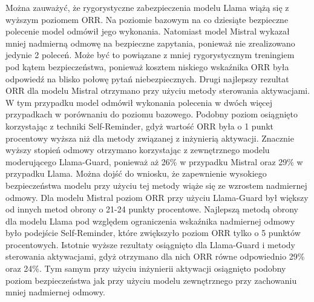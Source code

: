 Można zauważyć, że rygorystyczne zabezpieczenia modelu Llama wiążą się z wyższym poziomem \gls{ORR}. Na poziomie bazowym na co dziesiąte bezpieczne polecenie model odmówił jego wykonania. Natomiast model Mistral wykazał mniej nadmierną odmowę na bezpieczne zapytania, ponieważ nie zrealizowano jedynie 2 poleceń. Może być to powiązane z mniej rygorystycznym treningiem pod kątem bezpieczeństwa, ponieważ kosztem niskiego wskaźnika \gls{ORR} była odpowiedź na blisko połowę pytań niebezpiecznych. Drugi najlepszy rezultat \gls{ORR} dla modelu Mistral otrzymano przy użyciu metody sterowania aktywacjami. W tym przypadku model odmówił wykonania polecenia w dwóch więcej przypadkach w porównaniu do poziomu bazowego. Podobny poziom osiągnięto korzystając z techniki Self-Reminder, gdyż wartość \gls{ORR} była o 1 punkt procentowy wyższa niż dla metody związanej z inżynierią aktywacji. Znacznie wyższy stopień odmowy otrzymano korzystając z zewnętrznego modelu moderującego Llama-Guard, ponieważ aż 26\% w przypadku Mistral oraz 29\% w przypadku Llama. Można dojść do wniosku, że zapewnienie wysokiego bezpieczeństwa modelu przy użyciu tej metody wiąże się ze wzrostem nadmiernej odmowy. Dla modelu Mistral poziom \gls{ORR} przy użyciu Llama-Guard był większy od innych metod obrony o 21-24 punkty procentowe. Najlepszą metodą obrony dla modelu Llama pod względem ograniczenia wskaźnika nadmiernej odmowy było podejście Self-Reminder, które zwiększyło poziom \gls{ORR} tylko o 5 punktów procentowych. Istotnie wyższe rezultaty osiągnięto dla Llama-Guard i metody sterowania aktywacjami, gdyż otrzymano dla nich \gls{ORR} równe odpowiednio 29\% oraz 24\%. Tym samym przy użyciu inżynierii aktywacji osiągnięto podobny poziom bezpieczeństwa jak przy użyciu modelu zewnętrznego przy zachowaniu mniej nadmiernej odmowy.

